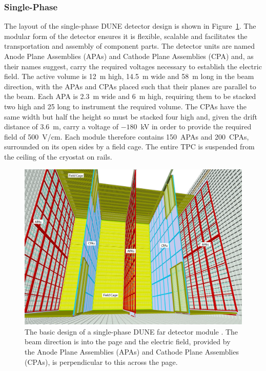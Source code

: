 \subsubsection{Single-Phase}\label{sec:DUNESinglePhase}

The layout of the single-phase DUNE detector design is shown in Figure~\ref{fig:DUNEFarDetectorDesign}.  The modular form of the detector ensures it is flexible, scalable and facilitates the transportation and assembly of component parts.  The detector units are named Anode Plane Assemblies (APAs) and Cathode Plane Assemblies (CPA) and, as their names suggest, carry the required voltages necessary to establish the electric field.  The active volume is 12~m high, 14.5~m wide and 58~m long in the beam direction, with the APAs and CPAs placed such that their planes are parallel to the beam.  Each APA is 2.3~m wide and 6~m high, requiring them to be stacked two high and 25 long to instrument the required volume.  The CPAs have the same width but half the height so must be stacked four high and, given the drift distance of 3.6~m, carry a voltage of $-180$~kV in order to provide the required field of 500~V/cm.  Each module therefore contains 150~APAs and 200~CPAs, surrounded on its open sides by a field cage.  The entire TPC is suspended from the ceiling of the cryostat on rails.

\begin{figure}
  \centering
  \includegraphics[width=14cm]{DUNEFarDetectorDesign.png}
  \caption[The basic design of a single-phase DUNE far detector module.]{The basic design of a single-phase DUNE far detector module \cite{DUNECDR4}.  The beam direction is into the page and the electric field, provided by the Anode Plane Assemblies (APAs) and Cathode Plane Assemblies (CPAs), is perpendicular to this across the page.}
  \label{fig:DUNEFarDetectorDesign}
\end{figure}

